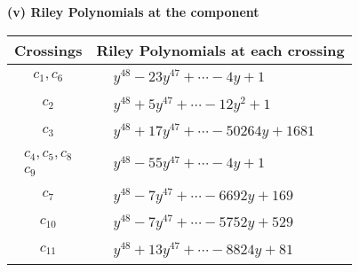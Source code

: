 \documentclass[1p]{elsarticle_modified}
\theoremstyle{definition}
\begin{document}
\newpage\renewcommand{\arraystretch}{1}
\flushleft \textbf{(v) Riley Polynomials at the component}\newline \\
\begin{tabular}{m{50pt}|m{274pt}}
Crossings & \hspace{64pt}Riley Polynomials at each crossing \\
\hline $$\begin{aligned}c_{1},c_{6}\end{aligned}$$&$\begin{aligned}
&y^{48}-23 y^{47}+\cdots-4 y+1
\end{aligned}$\\
\hline $$\begin{aligned}c_{2}\end{aligned}$$&$\begin{aligned}
&y^{48}+5 y^{47}+\cdots-12 y^2+1
\end{aligned}$\\
\hline $$\begin{aligned}c_{3}\end{aligned}$$&$\begin{aligned}
&y^{48}+17 y^{47}+\cdots-50264 y+1681
\end{aligned}$\\
\hline $$\begin{aligned}c_{4},c_{5},c_{8}\\c_{9}\end{aligned}$$&$\begin{aligned}
&y^{48}-55 y^{47}+\cdots-4 y+1
\end{aligned}$\\
\hline $$\begin{aligned}c_{7}\end{aligned}$$&$\begin{aligned}
&y^{48}-7 y^{47}+\cdots-6692 y+169
\end{aligned}$\\
\hline $$\begin{aligned}c_{10}\end{aligned}$$&$\begin{aligned}
&y^{48}-7 y^{47}+\cdots-5752 y+529
\end{aligned}$\\
\hline $$\begin{aligned}c_{11}\end{aligned}$$&$\begin{aligned}
&y^{48}+13 y^{47}+\cdots-8824 y+81
\end{aligned}$\\
\hline
\end{tabular}\\~\\
\end{document}

